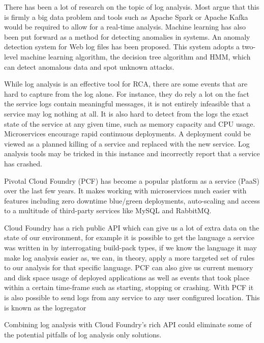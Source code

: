 There has been a lot of research on the topic of log analysis. Most argue that this is firmly a big data problem and tools such as Apache Spark\cite{8067504} or Apache Kafka\cite{adamson2014combined} would be required to allow for a real-time analysis. Machine learning has also been put forward as a method for detecting anomalies in systems. An anomaly detection system for Web log files has been proposed. This system adopts a two-level machine learning algorithm, the decision tree algorithm and HMM, which can detect anomalous data and spot unknown attacks\cite{8322600}.

While log analysis is an effective tool for RCA, there are some events that are hard to capture from the log alone. For instance, they do rely a lot on the fact the service logs contain meaningful messages, it is not entirely infeasible that a service may log nothing at all. It is also hard to detect from the logs the exact state of the service at any given time, such as memory capacity and CPU usage. Microservices encourage rapid continuous deployments\cite{villamizar2015evaluating}. A deployment could be viewed as a planned killing of a service and replaced with the new service. Log analysis tools may be tricked in this instance and incorrectly report that a service has crashed. 

Pivotal Cloud Foundry\cite{6924673} (PCF) has become a popular platform as a service (PaaS) over the last few years. It makes working with microservices much easier with features including zero downtime blue/green deployments, auto-scaling and access to a multitude of third-party services like MySQL and RabbitMQ.

Cloud Foundry has a rich public API which can give us a lot of extra data on the state of our environment, for example it is possible to get the language a service was written in by interrogating build-pack types, if we know the language it may make log analysis easier as, we can, in theory, apply a more targeted set of rules to our analysis for that specific language. PCF can also give us current memory and disk space usage of deployed applications as well as events that took place within a certain time-frame such as starting, stopping or crashing. With PCF it is also possible to send logs from any service to any user configured location. This is known as the logregator\cite{winn2017cloud}

Combining log analysis with Cloud Foundry's rich API could eliminate some of the potential pitfalls of log analysis only solutions. 